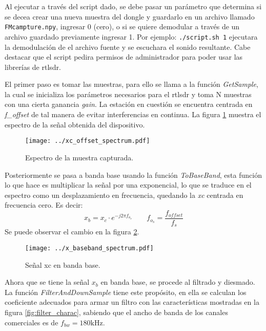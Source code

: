 Al ejecutar a través del script dado, se debe pasar un parámetro que determina si se decea crear una nueva muestra del dongle y guardarlo en un archivo llamado \texttt{FMcampture.npy}, ingresar 0 (cero), o si se quiere demodular a través de un archivo guardado previamente ingresar 1.
Por ejemplo: \texttt{./script.sh 1} ejecutara la demodulación de el archivo fuente y se escuchara el sonido resultante. Cabe destacar que el script pedira permisos de administrador para poder usar las librerías de rtlsdr.

El primer paso es tomar las muestras, para ello se llama a la función \emph{GetSample}, la cual se inicializa los parámetros necesarios para el rtlsdr y toma N muestras con una cierta ganancia \emph{gain}.
La estación en cuestión se encuentra centrada en \emph{f\_offset} de tal manera de evitar interferencias en continua.
La figura \ref{fig:xc_offset_spectrum} muestra el espectro de la señal obtenida del dispositivo.
\begin{figure}[ht!]
	\centering
	\texttt{[image: ../xc\_offset\_spectrum.pdf]}
	\caption{Espectro de la muestra capturada.}
	\label{fig:xc_offset_spectrum}
\end{figure}

Posteriormente se pasa a banda base usando la función \emph{ToBaseBand}, esta función lo que hace es multiplicar la señal por una exponencial, lo que se traduce en el espectro como un desplazamiento en frecuencia, quedando la \emph{xc} centrada en frecuencia cero. Es decir:
$$
	x_b = x_c \cdot e^{-j 2 \pi f_{o_s}} \quad \quad f_{o_s} = \frac{f_{offset}}{f_s}
$$
Se puede observar el cambio en la figura \ref{fig:x_baseband_spectrum}.
\begin{figure}[ht!]
	\centering
	\texttt{[image: ../x\_baseband\_spectrum.pdf]}
	\caption{Señal xc en banda base.}
	\label{fig:x_baseband_spectrum}
\end{figure}

Ahora que se tiene la señal $x_b$ en banda base, se procede al filtrado y diesmado.
La función \emph{FilterAndDownSample} tiene este propósito, en ella se calculan los coeficiente adecuados para armar un filtro con las características mostradas en la figura \ref{fig:filter_charac}, sabiendo que el ancho de banda de los canales comerciales es de $f_{bw} = 180 \mbox{kHz}$.

